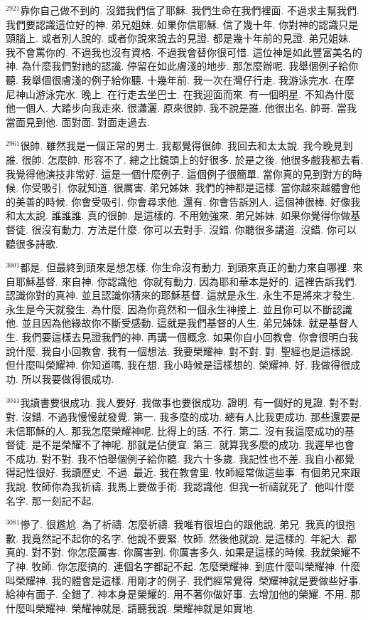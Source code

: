 \documentclass{book}
\begin{document}
$^{2921}$靠你自己做不到的.
沒錯我們信了耶穌.
我們生命在我們裡面.
不過求主幫我們.
我們要認識這位好的神.
弟兄姐妹.
如果你信耶穌.
信了幾十年.
你對神的認識只是頭腦上.
或者別人說的.
或者你說來說去的見證.
都是幾十年前的見證.
弟兄姐妹.
我不會罵你的.
不過我也沒有資格.
不過我會替你很可惜.
這位神是如此豐富美名的神.
為什麼我們對祂的認識.
停留在如此膚淺的地步.
那怎麼辦呢.
我舉個例子給你聽.
我舉個很膚淺的例子給你聽.
十幾年前.
我一次在灣仔行走.
我游泳完水.
在摩尼神山游泳完水.
晚上.
在行走去坐巴士.
在我迎面而來.
有一個明星.
不知為什麼他一個人.
大踏步向我走來.
很瀟灑.
原來很帥.
我不說是誰.
他很出名.
帥哥.
當我當面見到他.
面對面.
對面走過去.

$^{2961}$很帥.
雖然我是一個正常的男士.
我都覺得很帥.
我回去和太太說.
我今晚見到誰.
很帥.
怎麼帥.
形容不了.
總之比鏡頭上的好很多.
於是之後.
他很多戲我都去看.
我覺得他演技非常好.
這是一個什麼例子.
這個例子很簡單.
當你真的見到對方的時候.
你受吸引.
你就知道.
很厲害.
弟兄姊妹.
我們的神都是這樣.
當你越來越體會他的美善的時候.
你會受吸引.
你會尋求他.
還有.
你會告訴別人.
這個神很棒.
好像我和太太說.
誰誰誰.
真的很帥.
是這樣的.
不用勉強來.
弟兄姊妹.
如果你覺得你做基督徒.
很沒有動力.
方法是什麼.
你可以去對手.
沒錯.
你聽很多講道.
沒錯.
你可以聽很多詩歌.

$^{3001}$都是.
但最終到頭來是想怎樣.
你生命沒有動力.
到頭來真正的動力來自哪裡.
來自耶穌基督.
來自神.
你認識他.
你就有動力.
因為耶和華本是好的.
這裡告訴我們.
認識你對的真神.
並且認識你猜來的耶穌基督.
這就是永生.
永生不是將來才發生.
永生是今天就發生.
為什麼.
因為你竟然和一個永生神接上.
並且你可以不斷認識他.
並且因為他緣故你不斷受感動.
這就是我們基督的人生.
弟兄姊妹.
就是基督人生.
我們要這樣去見證我們的神.
再講一個概念.
如果你自小回教會.
你會很明白我說什麼.
我自小回教會.
我有一個想法.
我要榮耀神.
對不對.
對.
聖經也是這樣說.
但什麼叫榮耀神.
你知道嗎.
我在想.
我小時候是這樣想的.
榮耀神.
好.
我做得很成功.
所以我要做得很成功.

$^{3041}$我讀書要很成功.
我人要好.
我做事也要很成功.
證明.
有一個好的見證.
對不對.
對.
沒錯.
不過我慢慢就發覺.
第一.
我多麼的成功.
總有人比我更成功.
那些還要是未信耶穌的人.
那我怎麼榮耀神呢.
比得上的話.
不行.
第二.
沒有我這麼成功的基督徒.
是不是榮耀不了神呢.
那就是佔便宜.
第三.
就算我多麼的成功.
我遲早也會不成功.
對不對.
我不怕舉個例子給你聽.
我六十多歲.
我記性也不差.
我自小都覺得記性很好.
我讀歷史.
不過.
最近.
我在教會里.
牧師經常做這些事.
有個弟兄來跟我說.
牧師你為我祈禱.
我馬上要做手術.
我認識他.
但我一祈禱就死了.
他叫什麼名字.
那一刻記不起.

$^{3081}$慘了.
很尷尬.
為了祈禱.
怎麼祈禱.
我唯有很坦白的跟他說.
弟兄.
我真的很抱歉.
我竟然記不起你的名字.
他說不要緊.
牧師.
然後他就說.
是這樣的.
年紀大.
都真的.
對不對.
你怎麼厲害.
你厲害到.
你厲害多久.
如果是這樣的時候.
我就榮耀不了神.
牧師.
你怎麼搞的.
連個名字都記不起.
怎麼榮耀神.
到底什麼叫榮耀神.
什麼叫榮耀神.
我的體會是這樣.
用剛才的例子.
我們經常覺得.
榮耀神就是要做些好事.
給神有面子.
全錯了.
神本身是榮耀的.
用不著你做好事.
去增加他的榮耀.
不用.
那什麼叫榮耀神.
榮耀神就是.
請聽我說.
榮耀神就是如實地.
\end{document}
